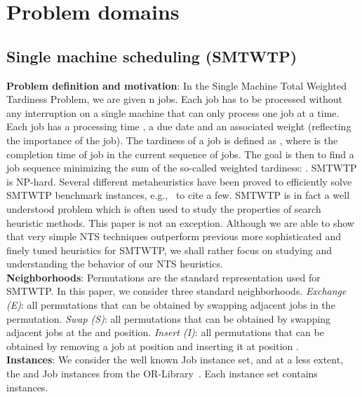 \documentclass{acm_proc_article-sp}
\begin{document}
\section{Problem domains}\label{sec:prob}
\subsection{Single machine scheduling (SMTWTP)}
\textbf{Problem definition and motivation}: In the Single Machine Total Weighted Tardiness Problem, we are given n jobs. Each job has to be processed without any interruption on a single machine that can only process one job at a time. Each job has a processing time  , a due date  and an associated weight  (reflecting the importance of the job). The tardiness of a job  is defined as , where  is the completion time of job  in the current sequence of jobs. The goal is then to find a job sequence minimizing the sum of the so-called weighted tardiness: . SMTWTP is NP-hard. Several different metaheuristics have been proved to efficiently solve SMTWTP benchmark instances, e.g.,~\cite{vnd,ILS,dyna} to cite a few. SMTWTP is in fact a well understood problem which is often used to study the properties of search heuristic methods. This paper is not an exception. Although we are able to show that very simple NTS techniques outperform previous more sophisticated and finely tuned heuristics for SMTWTP, we shall rather focus on studying and understanding the behavior of our NTS heuristics.\\
\textbf{Neighborhoods}: Permutations are the standard representation used for SMTWTP. In this paper, we consider three standard neighborhoods. \textit{Exchange (E)}: all permutations that can be obtained by swapping adjacent jobs in the permutation. \textit{Swap (S)}:  all permutations that can be obtained by swapping adjacent jobs at the  and  position. \textit{Insert (I)}: all permutations that can be obtained by removing a job at position  and inserting it at position .\\
\textbf{Instances}: We consider the well known  Job instance set, and at a less extent, the  and  Job instances from the OR-Library~\cite{or}. Each instance set contains  instances.
\end{document}

